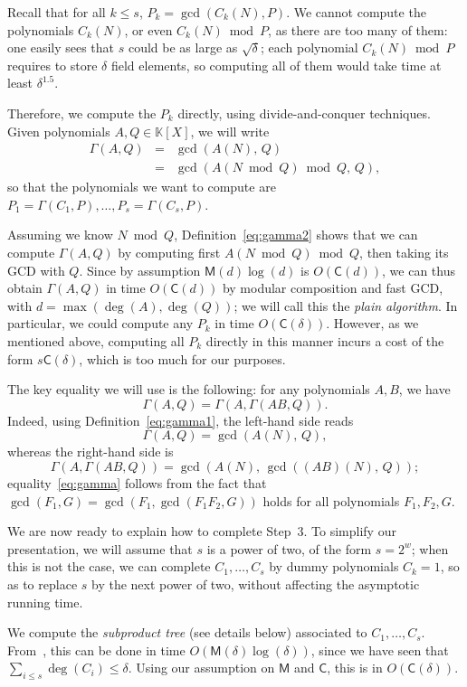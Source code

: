 \documentclass[12pt]{article}
\def\CC {\ensuremath{\mathsf{C}}}
\def\K {\ensuremath{\mathbb{K}}}
\def\M {\ensuremath{\mathsf{M}}}
\begin{document}
Recall that for all $k \le s$, $P_k=\gcd(C_k(N),P)$. We cannot compute
the polynomials $C_k(N)$, or even $C_k(N)\bmod P$, as there are too
many of them: one easily sees that $s$ could be as large as
$\sqrt{\delta}$; each polynomial $C_k(N)\bmod P$ requires to store
$\delta$ field elements, so computing all of them would take time at
least $\delta^{1.5}$.

Therefore, we compute the $P_k$ directly, using divide-and-conquer
techniques. Given polynomials $A,Q \in \K[X]$, we will write
\begin{eqnarray}
  \label{eq:gamma1}\Gamma(A,Q)&=&\gcd(A(N),\,Q)\\
  \label{eq:gamma2}&=&\gcd(A(N \bmod Q)\bmod Q,\,Q),
\end{eqnarray} so that the polynomials we want to compute are
$P_1=\Gamma(C_1,P),\dots,P_s=\Gamma(C_s,P)$. 

Assuming we know $N \bmod Q$, Definition~\eqref{eq:gamma2} shows that
we can compute $\Gamma(A, Q)$ by computing first $A(N \bmod Q)\bmod
Q$, then taking its GCD with $Q$. Since by assumption $\M(d)\log(d)$
is $O(\CC(d))$, we can thus obtain $\Gamma(A, Q)$ in time $O(\CC(d))$
by modular composition and fast GCD, with $d=\max(\deg(A),\deg(Q))$;
we will call this the {\em plain algorithm}. In particular, we could
compute any $P_k$ in time $O(\CC(\delta))$. However, as we mentioned
above, computing all $P_k$ directly in this manner incurs a cost of
the form $s \CC(\delta)$, which is too much for our purposes.

The key equality we will use is the following: for any polynomials
$A,B$, we have
\begin{equation}\label{eq:gamma}\Gamma(A, Q) = \Gamma(A, \Gamma(AB,
  Q)).\end{equation}
Indeed, using Definition~\eqref{eq:gamma1}, the left-hand side
reads
$$\Gamma(A, Q)=\gcd(A(N),\,Q),$$
whereas the right-hand side is
$$\Gamma(A, \Gamma(AB, Q))=\gcd(A(N),\,\gcd((AB)(N),\,Q));$$
equality~\eqref{eq:gamma} follows from the fact that
$\gcd(F_1,G)=\gcd(F_1,\gcd(F_1F_2,G))$ holds for all polynomials
$F_1,F_2,G$.

We are now ready to explain how to complete Step~3.  To simplify our
presentation, we will assume that $s$ is a power of two, of the form
$s=2^w$; when this is not the case, we can complete $C_1,\dots,C_s$ by
dummy polynomials $C_k=1$, so as to replace $s$ by the next power of
two, without affecting the asymptotic running time.

\bigskip{} We compute the {\em subproduct tree}
(see details below) associated to
$C_1,\dots,C_s$. From~\cite[Chapter~10]{GaGe03}, this can be done in
time $O(\M(\delta)\log(\delta))$, since we have seen that $\sum_{i \le
  s} \deg(C_i) \le \delta$. Using our assumption on $\M$ and $\CC$,
this is in $O(\CC(\delta))$.
\end{document}
